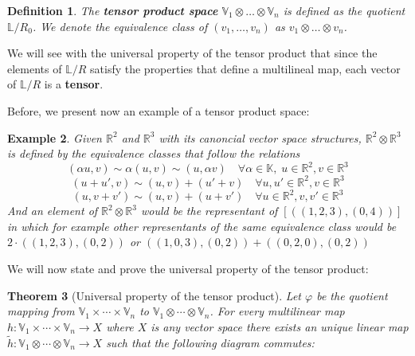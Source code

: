 \documentclass[11pt,a4paper,openright,oneside]{book}
\numberwithin{equation}{section}
\newtheorem{defn0}{Definition}[chapter]
\newtheorem{thm0}[defn0]{Theorem}
\newtheorem{example0}[defn0]{Example}
\newenvironment{definition}{ \begin{defn0}}{\end{defn0}}
\newenvironment{theorem}{\bigskip \begin{thm0}}{\end{thm0}}
\newenvironment{example}{ \begin{example0}\rm}{\end{example0}}
\begin{document}
\begin{definition} 
    The \textbf{tensor product space} $\mathbb{V}_1 \otimes \dots \otimes \mathbb{V}_n$ is defined as the quotient $\mathbb{L} / R_0$. 
    We denote the equivalence class of $(v_1, \dots, v_n)$ as $v_1 \otimes \dots \otimes v_n$. 
\end{definition}
    We will see with the universal property of the tensor product that since the 
    elements of $\mathbb{L}/R$ satisfy the properties that define a multilineal map, each vector of $\mathbb{L} / R$ is a \textbf{tensor}.

Before, we present now an example of a tensor product space:

\begin{example}
    Given $\mathbb{R}^2$ and $\mathbb{R}^3$ with its canoncial vector space
    structures, $\mathbb{R}^2 \otimes \mathbb{R}^3$ is defined by the equivalence classes that follow the relations
    $$(\alpha u, v) \sim \alpha (u, v) \sim (u, \alpha v) \quad \forall \alpha \in \mathbb{K}, \; u \in \mathbb{R}^2, v \in \mathbb{R}^3$$
    $$(u + u', v) \sim (u, v) + (u' + v) \quad \forall u, u' \in \mathbb{R}^2, v \in \mathbb{R}^3$$
    $$(u, v + v') \sim (u, v) + (u + v') \quad \forall u \in \mathbb{R}^2, v, v' \in \mathbb{R}^3$$
    And an element of $\mathbb{R}^2 \otimes \mathbb{R}^3$ would be the representant of $[((1, 2, 3), (0, 4))]$ in which
    for example other representants of the same equivalence class would be $2 \cdot ((1,2,3), (0, 2))$ or ${((1, 0, 3), (0, 2)) + ((0,2,0), (0, 2))}$
\end{example}
We will now state and prove the universal property of the tensor product:
\begin{theorem}[Universal property of the tensor product]
    Let $\varphi$ be the quotient mapping from $\mathbb{V}_1 \times \cdots \times \mathbb{V}_n$ to $\mathbb{V}_1 \otimes \cdots \otimes \mathbb{V}_n$. 
    For every multilinear map $h: \mathbb{V}_1 \times \cdots \times \mathbb{V}_n \rightarrow X$ where $X$ is any vector space there exists an unique linear map 
    $\tilde{h}: \mathbb{V}_1 \otimes \cdots \otimes \mathbb{V}_n \rightarrow X$ such that the following diagram commutes:

    \centering

\end{theorem}
\end{document}
